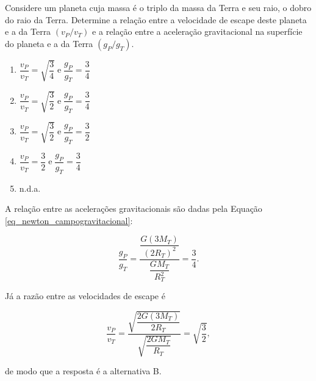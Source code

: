 \vspace{0.3cm}



\begin{exemplo}\label{exemplo_gravitacao_velocidadedeescapeex02}

Considere um planeta cuja massa é o triplo da massa da Terra e seu raio, o dobro do raio da Terra. Determine a relação entre a velocidade de escape deste planeta e a da Terra $(v_P/v_T)$ e a relação entre a aceleração gravitacional na superfície do planeta e a da Terra $(g_P/g_T)$.

\vspace{0.5cm}

\begin{enumerate}
    \item[(a)] $\dfrac{v_P}{v_T}=\sqrt{\dfrac{3}{4}} \;\text{e}\; \dfrac{g_P}{g_T}=\dfrac{3}{4}$
    
    \item[(b)] $\dfrac{v_P}{v_T}=\sqrt{\dfrac{3}{2}} \;\text{e}\; \dfrac{g_P}{g_T}=\dfrac{3}{4}$
    
    \item[(c)] $\dfrac{v_P}{v_T}=\sqrt{\dfrac{3}{2}} \;\text{e}\; \dfrac{g_P}{g_T}=\dfrac{3}{2}$
    
    \item[(d)] $\dfrac{v_P}{v_T}=\dfrac{3}{2} \;\text{e}\; \dfrac{g_P}{g_T}=\dfrac{3}{4}$
    
    \item[(e)] n.d.a.
\end{enumerate}

\resolucao

A relação entre as acelerações gravitacionais são dadas pela Equação \eqref{eq_newton_campogravitacional}:

$$ \dfrac{g_P}{g_T} = \dfrac{\dfrac{G(3M_T)}{(2R_T)^2}}{\dfrac{GM_T}{R_T^2}} = \dfrac{3}{4}.$$

Já a razão entre as velocidades de escape é

$$ \dfrac{v_P}{v_T} = \dfrac{\sqrt{\dfrac{2G(3M_T)}{2R_T}}}{\sqrt{\dfrac{2GM_T}{R_T}}} = \sqrt{\dfrac{3}{2}},$$

\noindent de modo que a resposta é a alternativa B.


\end{exemplo}





\vspace{0.3cm}





